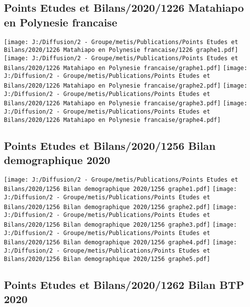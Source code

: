 \documentclass[
]{article}
\begin{document}
\hypertarget{points-etudes-et-bilans20201226-matahiapo-en-polynesie-francaise}{%
\subsection{Points Etudes et Bilans/2020/1226 Matahiapo en Polynesie
francaise}\label{points-etudes-et-bilans20201226-matahiapo-en-polynesie-francaise}}

\texttt{[image: J:/Diffusion/2 - Groupe/metis/Publications/Points Etudes et Bilans/2020/1226 Matahiapo en Polynesie francaise/1226 graphe1.pdf]}
\texttt{[image: J:/Diffusion/2 - Groupe/metis/Publications/Points Etudes et Bilans/2020/1226 Matahiapo en Polynesie francaise/graphe1.pdf]}
\texttt{[image: J:/Diffusion/2 - Groupe/metis/Publications/Points Etudes et Bilans/2020/1226 Matahiapo en Polynesie francaise/graphe2.pdf]}
\texttt{[image: J:/Diffusion/2 - Groupe/metis/Publications/Points Etudes et Bilans/2020/1226 Matahiapo en Polynesie francaise/graphe3.pdf]}
\texttt{[image: J:/Diffusion/2 - Groupe/metis/Publications/Points Etudes et Bilans/2020/1226 Matahiapo en Polynesie francaise/graphe4.pdf]}

\hypertarget{points-etudes-et-bilans20201256-bilan-demographique-2020}{%
\subsection{Points Etudes et Bilans/2020/1256 Bilan demographique
2020}\label{points-etudes-et-bilans20201256-bilan-demographique-2020}}

\texttt{[image: J:/Diffusion/2 - Groupe/metis/Publications/Points Etudes et Bilans/2020/1256 Bilan demographique 2020/1256 graphe1.pdf]}
\texttt{[image: J:/Diffusion/2 - Groupe/metis/Publications/Points Etudes et Bilans/2020/1256 Bilan demographique 2020/1256 graphe2.pdf]}
\texttt{[image: J:/Diffusion/2 - Groupe/metis/Publications/Points Etudes et Bilans/2020/1256 Bilan demographique 2020/1256 graphe3.pdf]}
\texttt{[image: J:/Diffusion/2 - Groupe/metis/Publications/Points Etudes et Bilans/2020/1256 Bilan demographique 2020/1256 graphe4.pdf]}
\texttt{[image: J:/Diffusion/2 - Groupe/metis/Publications/Points Etudes et Bilans/2020/1256 Bilan demographique 2020/1256 graphe5.pdf]}

\hypertarget{points-etudes-et-bilans20201262-bilan-btp-2020}{%
\subsection{Points Etudes et Bilans/2020/1262 Bilan BTP
2020}\label{points-etudes-et-bilans20201262-bilan-btp-2020}}
\end{document}
